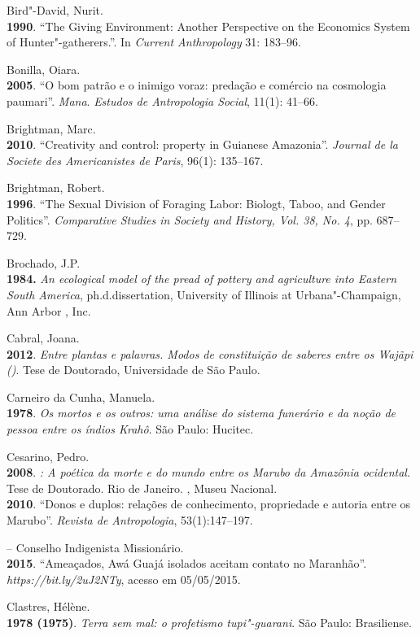 \begin{Parskip}
Bird"-David, Nurit.\\
\textbf{1990}. ``The Giving Environment: Another Perspective on the
Economics System of Hunter"-gatherers.''. In \emph{Current Anthropology}
31: 183--96.

Bonilla, Oiara.\\
\textbf{2005}. ``O bom patrão e o inimigo voraz: predação e comércio na
cosmologia paumari''. \emph{Mana}. \emph{Estudos de Antropologia
Social}, 11(1): 41--66.

Brightman, Marc.\\
\textbf{2010}. ``Creativity and control: property in Guianese
Amazonia''. \emph{Journal de la Societe des Americanistes de Paris},
96(1): 135--167.

Brightman, Robert.\\
\textbf{1996}. ``The Sexual Division of Foraging Labor: Biologt, Taboo,
and Gender Politics''. \emph{Comparative Studies in Society and History,
Vol. 38, No. 4}, pp. 687--729.

Brochado, J.P.\\
\textbf{1984.} \emph{An ecological model of the pread of pottery and
agriculture into Eastern South America}, ph.d.dissertation, University
of Illinois at Urbana"-Champaign, Ann Arbor , Inc.

Cabral, Joana.\\
\textbf{2012}. \emph{Entre plantas e palavras. Modos de constituição de
saberes entre os Wajãpi ()}. Tese de Doutorado, Universidade de São
Paulo.

Carneiro da Cunha, Manuela.\\
\textbf{1978}. \emph{Os mortos e os outros: uma análise do sistema
funerário e da noção de pessoa entre os índios Krahô}. São Paulo:
Hucitec.

Cesarino, Pedro.\\
\textbf{2008}. \emph{: A poética da morte e do mundo entre os
Marubo da Amazônia ocidental}. Tese de Doutorado. Rio de Janeiro. ,
Museu Nacional.\\
\textbf{2010}. ``Donos e duplos: relações de conhecimento, propriedade
e autoria entre os Marubo''. \emph{Revista de Antropologia},
53(1):147--197.

 -- Conselho Indigenista Missionário.\\
\textbf{2015}. ``Ameaçados, Awá Guajá isolados aceitam contato no
Maranhão''. \emph{https://bit.ly/2uJ2NTy}, acesso em 05/05/2015.

Clastres, Hélène.\\
\textbf{1978 (1975)}. \emph{Terra sem mal: o profetismo tupi"-guarani}.
São Paulo: Brasiliense.


\end{Parskip}
